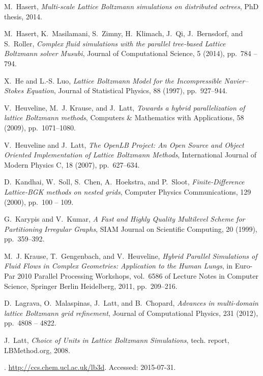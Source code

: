 \documentclass[final,leqno,onefignum,onetabnum]{siamltex1213}
\begin{document}
\begin{thebibliography}{10}
{\sc M.~Hasert}, {\em {M}ulti-scale {L}attice {B}oltzmann simulations on
  distributed octrees}, PhD thesis, 2014.

{\sc M.~Hasert, K.~Masilamani, S.~Zimny, H.~Klimach, J.~Qi, J.~Bernsdorf, and
  S.~Roller}, {\em Complex fluid simulations with the parallel tree-based
  {Lattice Boltzmann} solver {Musubi}}, Journal of Computational Science, 5
  (2014), pp.~784 -- 794.

{\sc X.~He and L.-S. Luo}, {\em {Lattice Boltzmann Model for the Incompressible
  Navier–Stokes Equation}}, Journal of Statistical Physics, 88 (1997),
  pp.~927--944.

{\sc V.~Heuveline, M.~J. Krause, and J.~Latt}, {\em {Towards a hybrid
  parallelization of lattice Boltzmann methods}}, Computers \& Mathematics with
  Applications, 58 (2009), pp.~1071--1080.

{\sc V.~Heuveline and J.~Latt}, {\em {The OpenLB Project: An Open Source and
  Object Oriented Implementation of Lattice Boltzmann Methods}}, International
  Journal of Modern Physics C, 18 (2007), pp.~627--634.

{\sc D.~Kandhai, W.~Soll, S.~Chen, A.~Hoekstra, and P.~Sloot}, {\em
  {Finite-Difference Lattice-BGK methods on nested grids}}, Computer Physics
  Communications, 129 (2000), pp.~100 -- 109.

{\sc G.~Karypis and V.~Kumar}, {\em {A Fast and Highly Quality Multilevel
  Scheme for Partitioning Irregular Graphs}}, SIAM Journal on Scientific
  Computing, 20 (1999), pp.~359--392.

{\sc M.~J. Krause, T.~Gengenbach, and V.~Heuveline}, {\em {Hybrid Parallel
  Simulations of Fluid Flows in Complex Geometries: Application to the Human
  Lungs}}, in Euro-Par 2010 Parallel Processing Workshops, vol.~6586 of Lecture
  Notes in Computer Science, Springer Berlin Heidelberg, 2011, pp.~209--216.

{\sc D.~Lagrava, O.~Malaspinas, J.~Latt, and B.~Chopard}, {\em Advances in
  multi-domain lattice {Boltzmann} grid refinement}, Journal of Computational
  Physics, 231 (2012), pp.~4808 -- 4822.

{\sc J.~Latt}, {\em {Choice of Units in Lattice Boltzmann Simulations}}, tech.
  report, LBMethod.org, 2008.

{}.
\newblock \url{http://ccs.chem.ucl.ac.uk/lb3d}.
\newblock Accessed: 2015-07-31.


\end{thebibliography}
\end{document}

